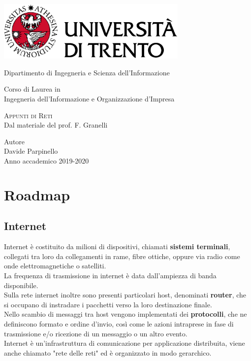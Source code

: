 \documentclass{report}
\begin{document}
	
	\begin{titlepage}
	\centering
	\includegraphics[width=0.7\textwidth]{logounitn.eps}

	\vspace{1.6cm}
	\LARGE{Dipartimento di Ingegneria e Scienza dell'Informazione\\}

	\vspace{1cm}
	\Large{Corso di Laurea in\\ Ingegneria dell'Informazione e Organizzazione d'Impresa}

	\vspace{1cm}
	\Huge\textsc{Appunti di Reti\\}
	\large{Dal materiale del prof. F. Granelli}

	\vspace{2cm}
	\Large{Autore}\\
	\large{Davide Parpinello}
	\\
	\vspace{2cm}
	\LARGE{Anno accademico 2019-2020}
	\end{titlepage}
	
	\tableofcontents
	\renewcommand{\chaptermark}[1]{%
		\markboth{#1}{}}
	\pagestyle{fancy}
	\fancyhf{}
	\lhead{\leftmark}
	\rfoot{\thepage}
	
	\chapter{Roadmap}
	\section{Internet}
	
	Internet è costituito da milioni di dispositivi, chiamati \textbf{sistemi terminali}, collegati tra loro da collegamenti in rame, fibre ottiche, oppure via radio come onde elettromagnetiche o satelliti.
	\medskip\\
	La frequenza di trasmissione in internet è data dall'ampiezza di banda disponibile.
	\medskip\\Sulla rete internet inoltre sono presenti particolari host, denominati \textbf{router}, che si occupano di instradare i pacchetti verso la loro destinazione finale.
	\medskip\\Nello scambio di messaggi tra host vengono implementati dei \textbf{protocolli}, che ne definiscono formato e ordine d'invio, così come le azioni intraprese in fase di trasmissione e/o ricezione di un messaggio o un altro evento.
	\medskip\\Internet è un'infrastruttura di comunicazione per applicazione distribuita, viene anche chiamato "rete delle reti" ed è organizzato in modo gerarchico.
\end{document}
